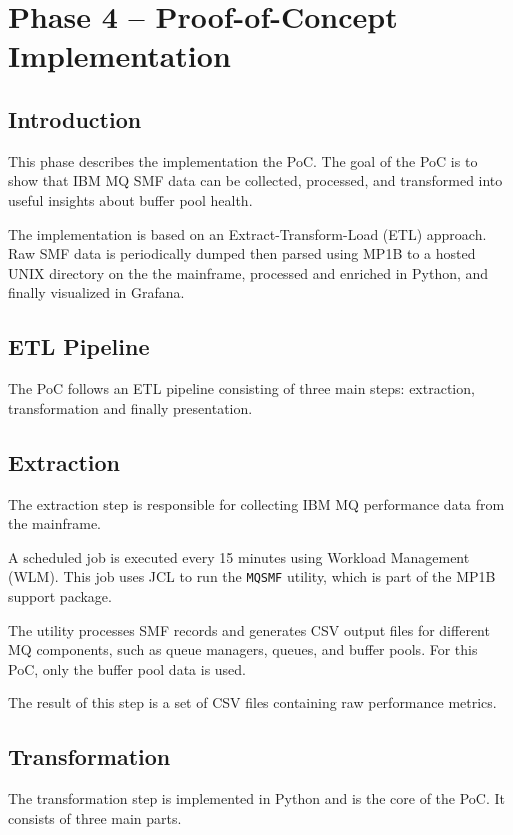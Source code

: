 \chapter{Phase 4 -- Proof-of-Concept Implementation}
\label{ch:phase4}

\section{Introduction}

This phase describes the implementation the PoC. The goal of the PoC is to show that IBM MQ SMF data can be collected, processed, and transformed into useful insights about buffer pool health.

The implementation is based on an Extract-Transform-Load (ETL) approach. Raw SMF data is periodically dumped then parsed using MP1B to a hosted UNIX directory on the the mainframe, processed and enriched in Python, and finally visualized in Grafana.

\section{ETL Pipeline}

The PoC follows an ETL pipeline consisting of three main steps: extraction, transformation and finally presentation.

\section{Extraction}

The extraction step is responsible for collecting IBM MQ performance data from the mainframe.

A scheduled job is executed every 15 minutes using Workload Management (WLM). This job uses JCL to run the \texttt{MQSMF} utility, which is part of the MP1B support package.

The utility processes SMF records and generates CSV output files for different MQ components, such as queue managers, queues, and buffer pools. For this PoC, only the buffer pool data is used.

The result of this step is a set of CSV files containing raw performance metrics.

\section{Transformation}

The transformation step is implemented in Python and is the core of the PoC. It consists of three main parts.


